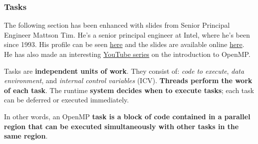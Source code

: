 \subsubsection{Tasks}

The following section has been enhanced with slides from Senior Principal Engineer Mattson Tim. He's a senior principal engineer at Intel, where he's been since 1993. His profile can be seen \href{https://www.intel.com/content/www/us/en/research/featured-researchers/tim-mattson.html}{here} and the slides are available online \href{https://www.openmp.org/wp-content/uploads/Intro_To_OpenMP_Mattson.pdf}{here}. He has also made an interesting \href{https://youtube.com/playlist?list=PLLX-Q6B8xqZ8n8bwjGdzBJ25X2utwnoEG&si=OBjyY4AI4zWfA-vB}{YouTube series} on the introduction to OpenMP.

\highspace
Tasks are \textbf{independent units of work}. They consist of: \emph{code to execute}, \emph{data environment}, and \emph{internal control variables} (ICV). \textbf{Threads perform the work of each task}. The runtime \textbf{system decides when to execute tasks}; each task can be deferred or executed immediately.

\highspace
In other words, an OpenMP \textbf{task is a block of code contained in a parallel region that can be executed simultaneously with other tasks in the same region}.

